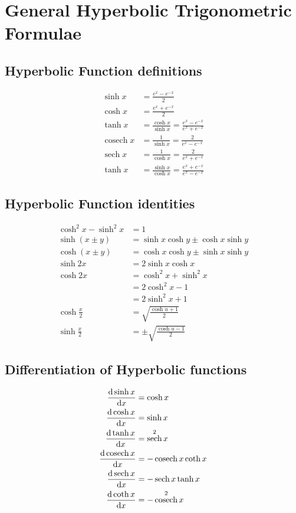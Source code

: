 \documentclass[12pt]{article}
\title{}
\author{}
\date{}
\DeclareMathOperator{\cosech}{cosech}
\DeclareMathOperator{\sech}{sech}
\newcommand{\pwidth}{0.46\linewidth}
\begin{document}
	
	\maketitle

	\section{General Hyperbolic Trigonometric Formulae}

	\begin{minipage}[t]{\pwidth}
		\subsection{Hyperbolic Function definitions}
		\begin{align}
			\sinh x &= \frac{e^x - e^{-x}}{2} \\
			\cosh x &= \frac{e^x + e^{-x}}{2} \\
			\tanh x &= \frac{\cosh x}{\sinh x} = \frac{e^x - e^{-x}}{e^x + e^{-x}} \\
			\cosech x &= \frac{1}{\sinh x} = \frac{2}{e^x - e^{-x}} \\
			\sech x &= \frac{1}{\cosh x} = \frac{2}{e^x + e^{-x}} \\
			\tanh x &= \frac{\sinh x}{\cosh x} = \frac{e^x + e^{-x}}{e^x - e^{-x}}
		\end{align}

		\subsection{Hyperbolic Function identities}
		\begin{align}
			\cosh^2x - \sinh^2x &= 1 \\
			\sinh (x \pm y) &= \sinh x \cosh y \pm \cosh x \sinh y \\
			\cosh (x \pm y) &= \cosh x \cosh y \pm \sinh x \sinh y \\
			\sinh 2x &= 2\sinh x \cosh x \\
			\cosh 2x &= \cosh^2x + \sinh^2x \\
					 &= 2\cosh^2x - 1 \\
					 &= 2\sinh^2x + 1 \\
			\cosh \frac{x}{2} &= \sqrt{\frac{\cosh u + 1}{2}} \\
			\sinh \frac{x}{2} &= \pm \sqrt{\frac{\cosh u - 1}{2}} 
		\end{align}

		\subsection{Differentiation of Hyperbolic functions}
		\begin{align}
			\odv{\sinh x}{x} &= \cosh x \\
			\odv{\cosh x}{x} &= \sinh x \\
			\odv{\tanh x}{x} &= \sech^2x \\
			\odv{\cosech x}{x} &= -\cosech x \coth x \\
			\odv{\sech x}{x} &= -\sech x \tanh x \\
			\odv{\coth x}{x} &= -\cosech^2x
		\end{align}
	\end{minipage}%
\end{document}
